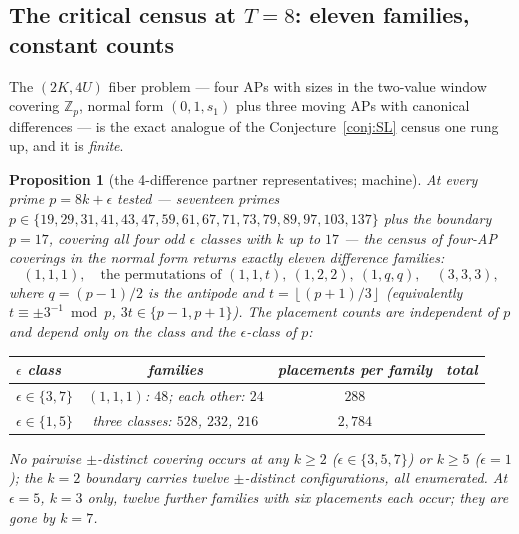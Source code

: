 \documentclass[11pt,a4paper]{article}
\numberwithin{equation}{section}
\theoremstyle{plain}
\newtheorem{proposition}[theorem]{Proposition}
\theoremstyle{definition}
\theoremstyle{remark}
\newcommand{\Z}{\mathbb{Z}}
\newcommand{\floor}[1]{\left\lfloor #1 \right\rfloor}
\begin{document}
\subsection{The critical census at \texorpdfstring{$T=8$}{T=8}: eleven families, constant counts}

The $(2K,4U)$ fiber problem --- four APs with sizes in the two-value
window covering $\Z_p$, normal form $(0,1,s_1)$ plus three moving APs
with canonical differences --- is the exact analogue of the
Conjecture~\ref{conj:SL} census one rung up, and it is \emph{finite}.

\begin{proposition}[the 4-difference partner representatives; machine]
\label{prop:T8census}
At every prime $p=8k+\epsilon$ tested --- seventeen primes
$p\in\{19,29,31,41,43,47,59,61,67,71,73,79,89,97,103,137\}$ plus the
boundary $p=17$, covering all four odd $\epsilon$ classes with $k$ up to
$17$ --- the census of four-AP coverings in the normal form returns
\emph{exactly eleven difference families}:
\[
(1,1,1),\quad\text{the permutations of }(1,1,t),\ (1,2,2),\ (1,q,q),
\quad(3,3,3),
\]
where $q=(p-1)/2$ is the antipode and $t=\floor{(p+1)/3}$ (equivalently
$t\equiv\pm3^{-1}\bmod p$, $3t\in\{p-1,p+1\}$). The placement counts are
independent of $p$ and depend only on the class and the $\epsilon$-class
of $p$:
\begin{center}
\small
\begin{tabular}{@{}lccc@{}}
\toprule
$\epsilon$ class & families & placements per family & total \\
\midrule
$\epsilon\in\{3,7\}$ & $(1,1,1)$: $48$; each other: $24$ & $288$ \\
$\epsilon\in\{1,5\}$ & three classes: $528$, $232$, $216$ & $2{,}784$ \\
\bottomrule
\end{tabular}
\end{center}
\noindent No pairwise $\pm$-distinct covering occurs at any $k\ge2$
($\epsilon\in\{3,5,7\}$) or $k\ge5$ ($\epsilon=1$); the $k=2$ boundary
carries twelve $\pm$-distinct configurations, all enumerated. At
$\epsilon=5$, $k=3$ only, twelve further families with six placements
each occur; they are gone by $k=7$.
\end{proposition}
\end{document}
